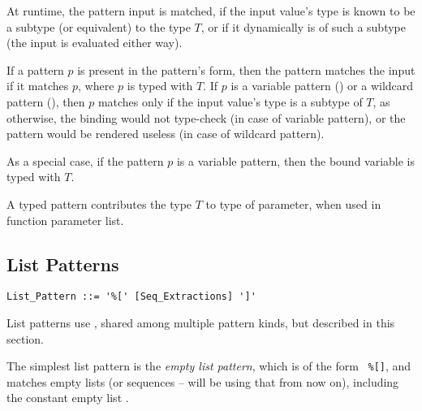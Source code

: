 At runtime, the pattern input is matched, if the input value's type is known to be a subtype (or equivalent) to the type $T$, or if it dynamically is of such a subtype (the input is evaluated either way). 

If a pattern $p$ is present in the pattern's form, then the pattern matches the input if it matches $p$, where $p$ is typed with $T$. If $p$ is a variable pattern () or a wildcard pattern (), then $p$ matches only if the input value's type is a subtype of $T$, as otherwise, the binding would not type-check (in case of variable pattern), or the pattern would be rendered useless (in case of wildcard pattern). 

As a special case, if the pattern $p$ is a variable pattern, then the bound variable is typed with $T$. 

A typed pattern contributes the type $T$ to type of parameter, when used in function parameter list. 





\subsection{List Patterns}
\label{sec:list-patterns}

\grammar\begin{lstlisting}
List_Pattern ::= '%[' [Seq_Extractions] ']'
\end{lstlisting}

List patterns use , shared among multiple pattern kinds, but described in this section. 

The simplest list pattern is the {\em empty list pattern}, which is of the form ~\lstinline!%[]!, and matches empty lists (or sequences -- will be using that from now on), including the constant empty list . 

